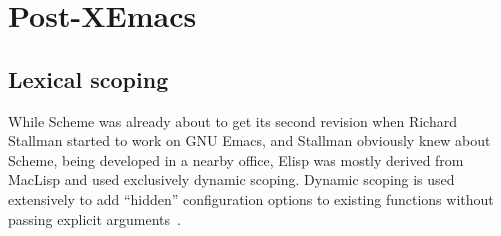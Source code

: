 \documentclass[format=acmsmall, review=false, screen=true]{acmart}
\newcommand \Elisp {Elisp}
\begin{document}
\section{Post-XEmacs}           %
\label{sec:post-xemacs}




\subsection{Lexical scoping}

While Scheme was already about to get its second revision when Richard
Stallman started to work on GNU Emacs, and Stallman obviously knew about
Scheme, being developed in a nearby office, \Elisp{} was mostly derived from
MacLisp and used exclusively dynamic scoping.  Dynamic scoping is used
extensively to add ``hidden'' configuration options to existing
functions without passing explicit arguments~\cite{Stallman1981}.
\end{document}
